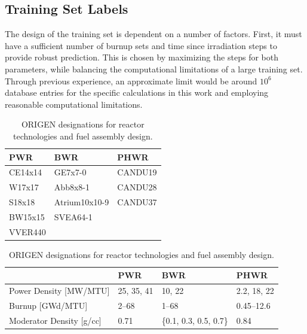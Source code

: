 \subsection{Training Set Labels}
\label{sec:snflbls}

The design of the training set is dependent on a number of factors.  First, it
must have a sufficient number of burnup sets and time since irradiation steps
to provide robust prediction. This is chosen by maximizing the steps for both
parameters, while balancing the computational limitations of a large training
set. Through previous experience, an approximate limit would be around $10^6$
database entries for the specific calculations in this work and employing
reasonable computational limitations.

\begin{table}[!htb]
  \centering
  \begin{subtable}{\linewidth}
    \centering
    \begin{tabular}{@{}lll@{}}
    \toprule
      \textbf{PWR} & \textbf{BWR}  & \textbf{PHWR} \\ \toprule
      CE14x14      & GE7x7-0       & CANDU19       \\
      W17x17       & Abb8x8-1      & CANDU28       \\
      S18x18       & Atrium10x10-9 & CANDU37       \\
      BW15x15      & SVEA64-1      &               \\
      VVER440      &               &               \\ \bottomrule
    \end{tabular}
    \caption{\acrshort{ORIGEN} designations for reactor technologies and fuel assembly design.}
    \label{tbl:rxtrtype}
    \vspace*{5mm}
  \end{subtable}
  \begin{subtable}{\linewidth}
    \centering
    \begin{tabular}{@{}llll@{}}
      \toprule
                                & \textbf{PWR}              & \textbf{BWR}              & \textbf{PHWR} \\ \toprule
      Power Density [MW/MTU]    & 25, 35, 41                & 10, 22                    & 2.2, 18, 22   \\
      Burnup [GWd/MTU]          & 2--68                     & 1--68                     & 0.45--12.6    \\
      Moderator Density [g/cc]  & 0.71                      & \{0.1, 0.3, 0.5, 0.7\}    & 0.84          \\

\end{tabular}
\end{subtable}
\end{table}
